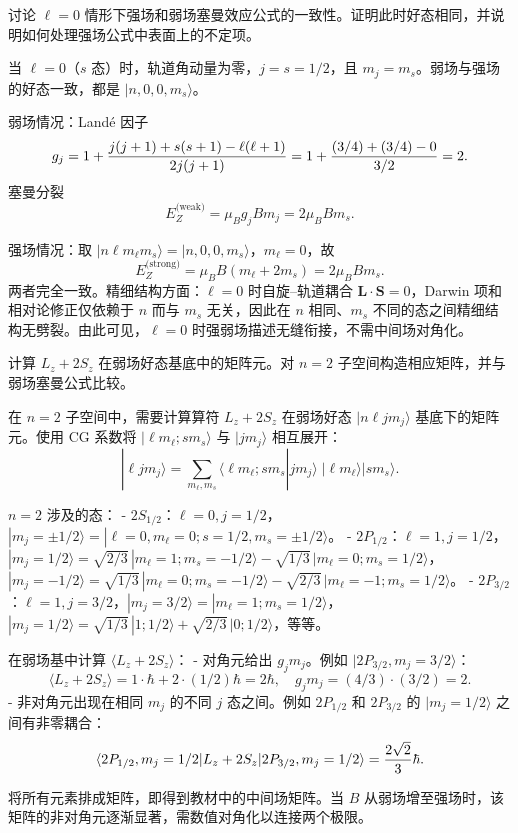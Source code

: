 \begin{question}
讨论 $\ell=0$ 情形下强场和弱场塞曼效应公式的一致性。证明此时好态相同，并说明如何处理强场公式中表面上的不定项。
\end{question}
\begin{solution}
当 $\ell=0$（$s$ 态）时，轨道角动量为零，$j=s=1/2$，且 $m_j=m_s$。弱场与强场的好态一致，都是 $|n,0,0,m_s\rangle$。

弱场情况：Land\'e 因子
\[
g_j = 1+{j(j+1)+s(s+1)-\ell(\ell+1)\over2j(j+1)}
= 1+{(3/4)+(3/4)-0\over3/2}=2.
\]
塞曼分裂
\[
E_Z^{\text{(weak)}} = \mu_B g_j B m_j = 2\mu_B B m_s.
\]

强场情况：取 $|n\ell m_\ell m_s\rangle = |n,0,0,m_s\rangle$，$m_\ell=0$，故
\[
E_Z^{\text{(strong)}} = \mu_B B(m_\ell+2m_s) = 2\mu_B B m_s.
\]
两者完全一致。精细结构方面：$\ell=0$ 时自旋--轨道耦合 $\mathbf L\cdot\mathbf S=0$，Darwin 项和相对论修正仅依赖于 $n$ 而与 $m_s$ 无关，因此在 $n$ 相同、$m_s$ 不同的态之间精细结构无劈裂。由此可见，$\ell=0$ 时强弱场描述无缝衔接，不需中间场对角化。
\end{solution}

\begin{question}
计算 $L_z+2S_z$ 在弱场好态基底中的矩阵元。对 $n=2$ 子空间构造相应矩阵，并与弱场塞曼公式比较。
\end{question}
\begin{solution}
在 $n=2$ 子空间中，需要计算算符 $L_z+2S_z$ 在弱场好态 $|n\ell j m_j\rangle$ 基底下的矩阵元。使用 CG 系数将 $|\ell m_\ell; s m_s\rangle$ 与 $|j m_j\rangle$ 相互展开：
\[
|\ell j m_j\rangle = \sum_{m_\ell,m_s} \langle \ell m_\ell; s m_s|j m_j\rangle\; |\ell m_\ell\rangle|s m_s\rangle.
\]

$n=2$ 涉及的态：
- $2S_{1/2}$：$\ell=0,j=1/2$，$|m_j=\pm1/2\rangle = |\ell=0,m_\ell=0; s=1/2,m_s=\pm1/2\rangle$。
- $2P_{1/2}$：$\ell=1,j=1/2$，$|m_j=1/2\rangle = \sqrt{2/3}\,|m_\ell=1;m_s=-1/2\rangle - \sqrt{1/3}\,|m_\ell=0;m_s=1/2\rangle$，$|m_j=-1/2\rangle = \sqrt{1/3}\,|m_\ell=0;m_s=-1/2\rangle - \sqrt{2/3}\,|m_\ell=-1;m_s=1/2\rangle$。
- $2P_{3/2}$：$\ell=1,j=3/2$，$|m_j=3/2\rangle=|m_\ell=1;m_s=1/2\rangle$，$|m_j=1/2\rangle = \sqrt{1/3}\,|1;1/2\rangle+\sqrt{2/3}\,|0;1/2\rangle$，等等。

在弱场基中计算 $\langle L_z+2S_z\rangle$：
- 对角元给出 $g_j m_j$。例如 $|2P_{3/2},m_j=3/2\rangle$：
  \[
  \langle L_z+2S_z\rangle = 1\cdot\hbar + 2\cdot(1/2)\hbar = 2\hbar,\quad
  g_j m_j = (4/3)\cdot(3/2)=2.
  \]
- 非对角元出现在相同 $m_j$ 的不同 $j$ 态之间。例如 $2P_{1/2}$ 和 $2P_{3/2}$ 的 $|m_j=1/2\rangle$ 之间有非零耦合：
  \[
  \langle 2P_{1/2},m_j=1/2|L_z+2S_z|2P_{3/2},m_j=1/2\rangle = {2\sqrt2\over3}\hbar.
  \]

将所有元素排成矩阵，即得到教材中的中间场矩阵。当 $B$ 从弱场增至强场时，该矩阵的非对角元逐渐显著，需数值对角化以连接两个极限。
\end{solution}

